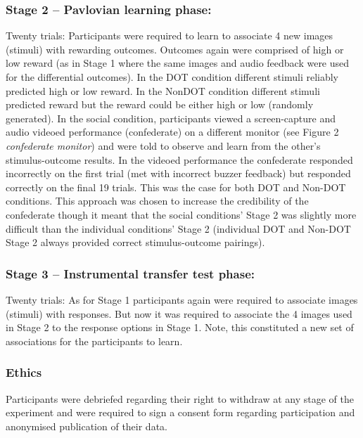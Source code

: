 \documentclass[]{elsarticle} %
\begin{document}
\hypertarget{stage-2-pavlovian-learning-phase}{%
\subsubsection{Stage 2 -- Pavlovian learning
phase:}\label{stage-2-pavlovian-learning-phase}}

Twenty trials: Participants were required to learn to associate 4 new
images (stimuli) with rewarding outcomes. Outcomes again were comprised
of high or low reward (as in Stage 1 where the same images and audio
feedback were used for the differential outcomes). In the DOT condition
different stimuli reliably predicted high or low reward. In the NonDOT
condition different stimuli predicted reward but the reward could be
either high or low (randomly generated). In the social condition,
participants viewed a screen-capture and audio videoed performance
(confederate) on a different monitor (see Figure 2 \emph{confederate
monitor}) and were told to observe and learn from the other's
stimulus-outcome results. In the videoed performance the confederate
responded incorrectly on the first trial (met with incorrect buzzer
feedback) but responded correctly on the final 19 trials. This was the
case for both DOT and Non-DOT conditions. This approach was chosen to
increase the credibility of the confederate though it meant that the
social conditions' Stage 2 was slightly more difficult than the
individual conditions' Stage 2 (individual DOT and Non-DOT Stage 2
always provided correct stimulus-outcome pairings).

\hypertarget{stage-3-instrumental-transfer-test-phase}{%
\subsubsection{Stage 3 -- Instrumental transfer test
phase:}\label{stage-3-instrumental-transfer-test-phase}}

Twenty trials: As for Stage 1 participants again were required to
associate images (stimuli) with responses. But now it was required to
associate the 4 images used in Stage 2 to the response options in Stage
1. Note, this constituted a new set of associations for the participants
to learn.

\hypertarget{ethics}{%
\subsubsection{Ethics}\label{ethics}}

Participants were debriefed regarding their right to withdraw at any
stage of the experiment and were required to sign a consent form
regarding participation and anonymised publication of their data.
\end{document}
